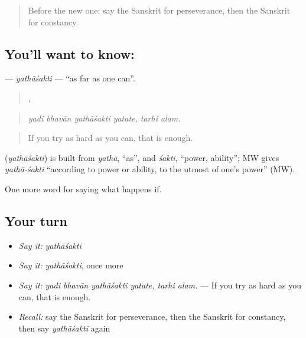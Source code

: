 \label{lesson:SA-C384-yathasakti}



\begin{quote}
Before the new one: say the Sanskrit for perseverance, then the Sanskrit for constancy.
\end{quote}

\subsection*{You'll want to know: }
\textbf{} — \emph{yathāśakti} — \textquotedblleft{}as far as one can\textquotedblright{}.

\begin{quote}
   ,  
\end{quote}

\begin{quote}
\emph{yadi bhavān yathāśakti yatate, tarhi alam.}
\end{quote}

\begin{quote}
If you try as hard as you can, that is enough.
\end{quote}

\begin{cousinweb}
\textbf{} (\emph{yathāśakti}) is built from \emph{yathā}, \textquotedblleft{}as\textquotedblright{}, and \emph{śakti}, \textquotedblleft{}power, ability\textquotedblright{}; MW gives \emph{yathā-śakti} \textquotedblleft{}according to power or ability, to the utmost of one's power\textquotedblright{} (MW).
\end{cousinweb}

\begin{grammarlens}[title={What you've built}]
One more word for saying what happens if.
\end{grammarlens}

\subsection*{Your turn}
\begin{itemize}
\raggedright
  \item \emph{Say it:} \emph{yathāśakti}
  \item \emph{Say it:} \emph{yathāśakti}, once more
  \item \emph{Say it:} \emph{yadi bhavān yathāśakti yatate, tarhi alam.} — If you try as hard as you can, that is enough.
  \item \emph{Recall:} say the Sanskrit for perseverance, then the Sanskrit for constancy, then say \emph{yathāśakti} again
\end{itemize}

